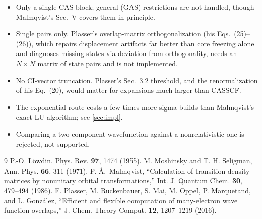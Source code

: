 \documentclass[aip,jcp,preprint]{revtex4-1}
\begin{document}
\begin{itemize}
\item Only a single CAS block; general (GAS) restrictions are not handled,
though Malmqvist's Sec.~V covers them in principle.
\item Single pairs only. Plasser's overlap-matrix orthogonalization
(his Eqs.~(25)--(26)), which repairs displacement artifacts far better than
core freezing alone and diagnoses missing states via deviation from
orthogonality, needs an $N\times N$ matrix of state pairs and is not
implemented.
\item No CI-vector truncation. Plasser's Sec.~3.2 threshold, and the
renormalization of his Eq.~(20), would matter for expansions much larger than
CASSCF.
\item The exponential route costs a few times more sigma builds than
Malmqvist's exact LU algorithm; see \cref{sec:impl}.
\item Comparing a two-component wavefunction against a nonrelativistic one is
rejected, not supported.
\end{itemize}

\begin{thebibliography}{9}
P.-O. L\"owdin, Phys. Rev. \textbf{97}, 1474 (1955).
M. Moshinsky and T. H. Seligman, Ann. Phys. \textbf{66}, 311 (1971).
P.-\AA.~Malmqvist,
``Calculation of transition density matrices by nonunitary orbital
transformations,''
Int. J. Quantum Chem. \textbf{30}, 479--494 (1986).
F. Plasser, M. Ruckenbauer, S. Mai, M. Oppel, P. Marquetand, and
L. Gonz\'alez,
``Efficient and flexible computation of many-electron wave function
overlaps,''
J. Chem. Theory Comput. \textbf{12}, 1207--1219 (2016).
\end{thebibliography}
\end{document}

